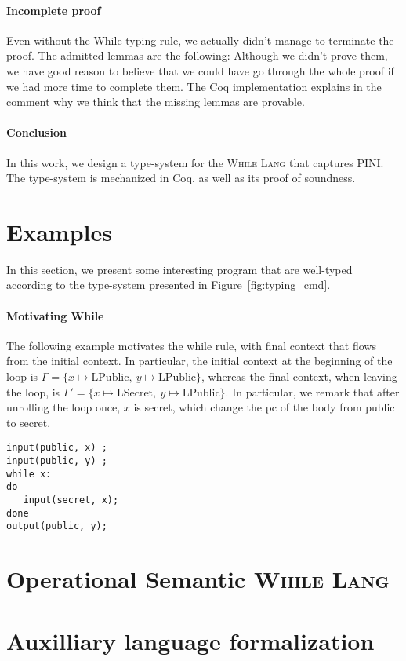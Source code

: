 \documentclass[10pt]{article}
\newcommand{\ctx}{\Gamma}
\newcommand{\public}{\mathrm{LPublic}}
\newcommand{\secret}{\mathrm{LSecret}}
\newcommand{\whilelang}{\textsc{While Lang} }
\begin{document}
\paragraph{Incomplete proof}
Even without the While typing rule, we actually didn't manage to terminate the proof.
The admitted lemmas are the following:
Although we didn't prove them, we have good reason to believe that we could have go through the
whole proof if we had more time to complete them. The Coq implementation explains in the comment why
we think that the missing lemmas are provable.

\paragraph{Conclusion}
In this work, we design a type-system for the \whilelang that captures PINI.
The type-system is mechanized in Coq, as well as its proof of soundness.

\appendix

\section{Examples}%
\label{sec:examples}

In this section, we present some interesting program that are well-typed according to the
type-system presented in Figure~\ref{fig:typing_cmd}.

\paragraph{Motivating While}
The following example motivates the while rule, with final context that flows from the initial
context. In particular, the initial context at the beginning of the loop is
$\ctx = \{ x \mapsto \public,\ y \mapsto \public \}$, whereas the final context, when leaving the
loop, is $\ctx' = \{ x \mapsto \secret,\ y \mapsto \public \}$. In particular, we remark that after
unrolling the loop once, $x$ is secret, which change the pc of the body from public to secret.
\begin{Verbatim}[samepage=true]
input(public, x) ;
input(public, y) ;
while x:
do
   input(secret, x);
done
output(public, y);
\end{Verbatim}

\section{Operational Semantic \whilelang}%




\section{Auxilliary language formalization}%



% 
% 
\end{document}
